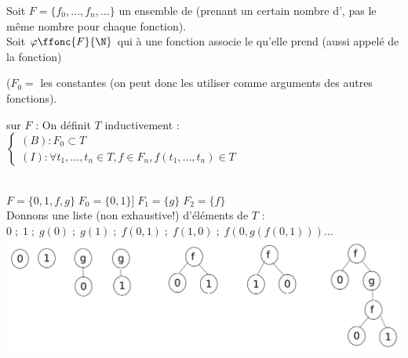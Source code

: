 Soit $F=\{f_0,\ldots,f_n,\ldots\}$ un ensemble de  (prenant un certain nombre d', pas le même nombre pour chaque fonction). \\

Soit $\varphi\ffonc{F}{\N}$ qui à une fonction associe le  qu'elle prend (aussi appelé  de la fonction)\\

\par
{} ($F_0 =$ les constantes (on peut donc les utiliser comme arguments des autres fonctions). \\

\par
{} sur $F$ : On définit $T$ inductivement : \\
$\left\{ \begin{array}{l}
	(B) : F_0 \subset T \\
	(I) : \forall t_1,\ldots,t_n\in T, f\in F_n, f(t_1,\ldots,t_n)\in T
\end{array} \right.$

\\
$F=\{0,1,f,g\}\; F_0=\{0,1\}] \; F_1=\{g\} \; F_2=\{f\}$ \\
Donnons une liste (non exhaustive!) d'éléments de $T$ : \\
$0 \; ; \; 1 \; ; \; g(0) \; ; \; g(1) \; ; \; f(0,1) \; ; \; f(1,0) \; ; \; f(0,g(f(0,1))) \ldots$\\
\includegraphics[width=0.8\linewidth]{D7_1.pdf}
